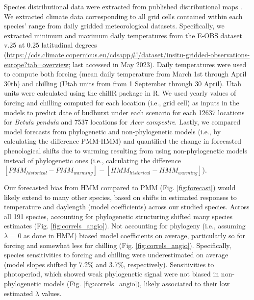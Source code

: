 \documentclass[11pt]{article}
\begin{document}
Species distributional data were extracted from published distributional maps \citep{caudullo2017chorological}. We extracted climate data corresponding to all grid cells contained within each species' range from daily gridded meteorological datasets. Specifically, we extracted minimum and maximum daily temperatures from the E-OBS dataset v.25 at 0.25 latitudinal degrees (\url{https://cds.climate.copernicus.eu/cdsapp#!/dataset/insitu-gridded-observations-europe?tab=overview}; last accessed in May 2023). Daily temperatures were used to compute both forcing (mean daily temperature from March 1st through April 30th) and chilling (Utah units from from 1 September through 30 April). Utah units were calculated using the chillR package in R. We used yearly values of forcing and chilling computed for each location (i.e., grid cell) as inputs in the models to predict date of budburst under each scenario for each 12637 locations for \emph{Betula pendula} and 7537 locations for \emph{Acer campestre}. Lastly, we compared model forecasts from phylogenetic and non-phylogenetic models (i.e., by calculating the difference PMM-HMM) and quantified the change in forecasted phenological shifts due to warming resulting from using non-phylogenetic models instead of phylogenetic ones (i.e., calculating the difference $[PMM_{historical} -PMM_{warming}]-[HMM_{historical}-HMM_{warming}]$).%

Our forecasted bias from HMM compared to PMM (Fig. \ref{fig:forecast}) would likely extend to many other species, based on shifts in estimated responses to temperature and daylength (model coefficients) across our studied species. Across all 191 species, accounting for phylogenetic structuring shifted many species estimates (Fig. \ref{fig:correls_angio}). Not accounting for phylogeny (i.e., assuming $\lambda$ = 0 as done in HMM) biased model coefficients on average, particularly so for forcing and somewhat less for chilling (Fig. \ref{fig:correls_angio}). Specifically, species sensitivities to forcing and chilling were underestimated on average (model slopes shifted by 7.2\% and 3.7\%, respectively). Sensitivities to photoperiod, which showed weak phylogenetic signal were not biased in non-phylogenetic models (Fig. \ref{fig:correls_angio}), likely associated to their low estimated $\lambda$ values. 
\end{document}
